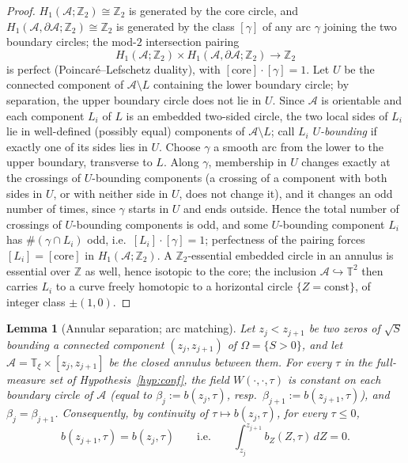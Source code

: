 \documentclass[11pt]{amsart}
\newtheorem{lemma}[theorem]{Lemma}
\theoremstyle{definition}
\theoremstyle{remark}
\newcommand{\T}{\mathbb{T}}
\newcommand{\ZZmod}{\mathbb{Z}_2}
\begin{document}
\begin{proof}
$H_1(\mathcal A;\ZZmod)\cong\ZZmod$ is generated by the core circle,
and $H_1(\mathcal A,\partial\mathcal A;\ZZmod)\cong\ZZmod$ is generated
by the class $[\gamma]$ of any arc $\gamma$ joining the two boundary
circles; the mod-$2$ intersection pairing
\[
  H_1(\mathcal A;\ZZmod)\times
  H_1(\mathcal A,\partial\mathcal A;\ZZmod)\longrightarrow\ZZmod
\]
is perfect (Poincar\'e--Lefschetz duality), with
$[\mathrm{core}]\cdot[\gamma]=1$. Let $U$ be the connected component of
$\mathcal A\setminus L$ containing the lower boundary circle; by
separation, the upper boundary circle does not lie in $U$. Since
$\mathcal A$ is orientable and each component $L_i$ of $L$ is an
embedded two-sided circle, the two local sides of $L_i$ lie in
well-defined (possibly equal) components of $\mathcal A\setminus L$;
call $L_i$ \emph{$U$-bounding} if exactly one of its sides lies in $U$.
Choose $\gamma$ a smooth arc from the lower to the upper boundary,
transverse to $L$. Along $\gamma$, membership in $U$ changes exactly at
the crossings of $U$-bounding components (a crossing of a component with
both sides in $U$, or with neither side in $U$, does not change it), and
it changes an odd number of times, since $\gamma$ starts in $U$ and ends
outside. Hence the total number of crossings of $U$-bounding components
is odd, and some $U$-bounding component $L_i$ has
$\#(\gamma\cap L_i)$ odd, i.e.\ $[L_i]\cdot[\gamma]=1$; perfectness of
the pairing forces $[L_i]=[\mathrm{core}]$ in
$H_1(\mathcal A;\ZZmod)$. A $\ZZmod$-essential embedded circle in an
annulus is essential over $\mathbb Z$ as well, hence isotopic to the
core; the inclusion $\mathcal A\hookrightarrow\T^2$ then carries $L_i$ to
a curve freely homotopic to a horizontal circle $\{Z=\mathrm{const}\}$,
of integer class $\pm(1,0)$.
\end{proof}

\begin{lemma}[Annular separation; arc matching]\label{lem:annular}
Let $z_j<z_{j+1}$ be two zeros of $\sqrt S$ bounding a connected
component $(z_j,z_{j+1})$ of $\Omega=\{S>0\}$, and let
$\mathcal A=\T_\xi\times[z_j,z_{j+1}]$ be the closed annulus between
them. For every $\tau$ in the full-measure set of
Hypothesis~\ref{hyp:conf}, the field $W(\cdot,\cdot,\tau)$ is constant
on each boundary circle of $\mathcal A$ (equal to
$\beta_j:=b(z_j,\tau)$, resp.\ $\beta_{j+1}:=b(z_{j+1},\tau)$), and
$\beta_j=\beta_{j+1}$. Consequently, by continuity of
$\tau\mapsto b(z_j,\tau)$, \emph{for every} $\tau\le0$,
\begin{equation}\label{eq:arc-matching}
  b(z_{j+1},\tau)=b(z_j,\tau)\qquad\text{i.e.}\qquad
  \int_{z_j}^{z_{j+1}}b_Z(Z,\tau)\,dZ=0 .
\end{equation}
\end{lemma}
\end{document}
